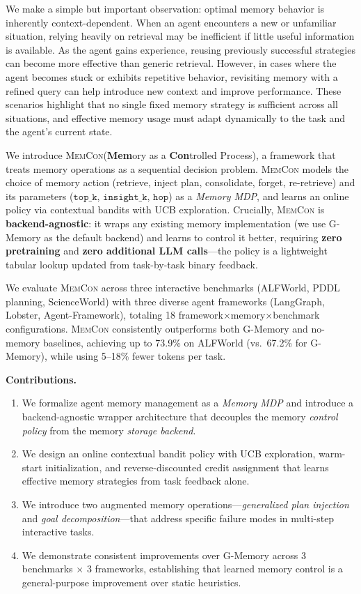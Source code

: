 \documentclass{article} %
\theoremstyle{plain}
\theoremstyle{definition}
\theoremstyle{remark}
\newcommand{\ours}{\textsc{MemCon}\xspace}
\begin{document}
We make a simple but important observation: optimal memory behavior is inherently context-dependent. When an agent encounters a new or unfamiliar situation, relying heavily on retrieval may be inefficient if little useful information is available. As the agent gains experience, reusing previously successful strategies can become more effective than generic retrieval. However, in cases where the agent becomes stuck or exhibits repetitive behavior, revisiting memory with a refined query can help introduce new context and improve performance. These scenarios highlight that no single fixed memory strategy is sufficient across all situations, and effective memory usage must adapt dynamically to the task and the agent’s current state.


We introduce \ours (\textbf{Mem}ory as a \textbf{Con}trolled Process), a framework that treats memory operations as a sequential decision problem.
\ours models the choice of memory action (retrieve, inject plan, consolidate, forget, re-retrieve) and its parameters ($\texttt{top\_k}$, $\texttt{insight\_k}$, $\texttt{hop}$) as a \emph{Memory MDP}, and learns an online policy via contextual bandits with UCB exploration.
Crucially, \ours is \textbf{backend-agnostic}: it wraps any existing memory implementation (we use G-Memory as the default backend) and learns to control it better, requiring \textbf{zero pretraining} and \textbf{zero additional LLM calls}---the policy is a lightweight tabular lookup updated from task-by-task binary feedback.

We evaluate \ours across three interactive benchmarks (ALFWorld, PDDL planning, ScienceWorld) with three diverse agent frameworks (LangGraph, Lobster, Agent-Framework), totaling 18 framework$\times$memory$\times$benchmark configurations.
\ours consistently outperforms both G-Memory and no-memory baselines, achieving up to 73.9\% on ALFWorld (vs.\ 67.2\% for G-Memory), while using 5--18\% fewer tokens per task.

\textbf{Contributions.}
\begin{enumerate}[leftmargin=1.5em, itemsep=2pt]
    \item We formalize agent memory management as a \emph{Memory MDP} and introduce a backend-agnostic wrapper architecture that decouples the memory \emph{control policy} from the memory \emph{storage backend}.
    \item We design an online contextual bandit policy with UCB exploration, warm-start initialization, and reverse-discounted credit assignment that learns effective memory strategies from task feedback alone.
    \item We introduce two augmented memory operations---\emph{generalized plan injection} and \emph{goal decomposition}---that address specific failure modes in multi-step interactive tasks.
    \item We demonstrate consistent improvements over G-Memory across 3 benchmarks $\times$ 3 frameworks, establishing that learned memory control is a general-purpose improvement over static heuristics.
\end{enumerate}
\end{document}
